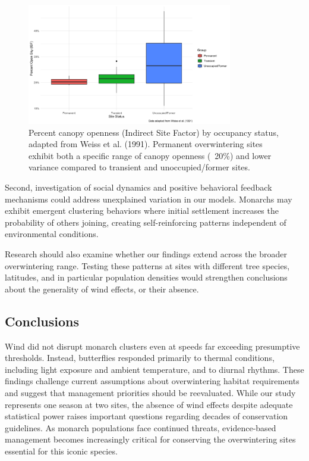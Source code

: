 \begin{figure}[h]
    \centering
    \includegraphics[width=0.8\textwidth]{figures/discussion/weiss_adapted_boxplot.png}
    \caption{Percent canopy openness (Indirect Site Factor) by occupancy status, adapted from Weiss et al. (1991). Permanent overwintering sites exhibit both a specific range of canopy openness (~20\%) and lower variance compared to transient and unoccupied/former sites.}
    \label{fig:weiss_canopy}
\end{figure}

Second, investigation of social dynamics and positive behavioral feedback mechanisms could address unexplained variation in our models. Monarchs may exhibit emergent clustering behaviors where initial settlement increases the probability of others joining, creating self-reinforcing patterns independent of environmental conditions.

Research should also examine whether our findings extend across the broader overwintering range. Testing these patterns at sites with different tree species, latitudes, and in particular population densities would strengthen conclusions about the generality of wind effects, or their absence.

\subsection{Conclusions}

Wind did not disrupt monarch clusters even at speeds far exceeding presumptive thresholds. Instead, butterflies responded primarily to thermal conditions, including light exposure and ambient temperature, and to diurnal rhythms. These findings challenge current assumptions about overwintering habitat requirements and suggest that management priorities should be reevaluated. While our study represents one season at two sites, the absence of wind effects despite adequate statistical power raises important questions regarding decades of conservation guidelines. As monarch populations face continued threats, evidence-based management becomes increasingly critical for conserving the overwintering sites essential for this iconic species.